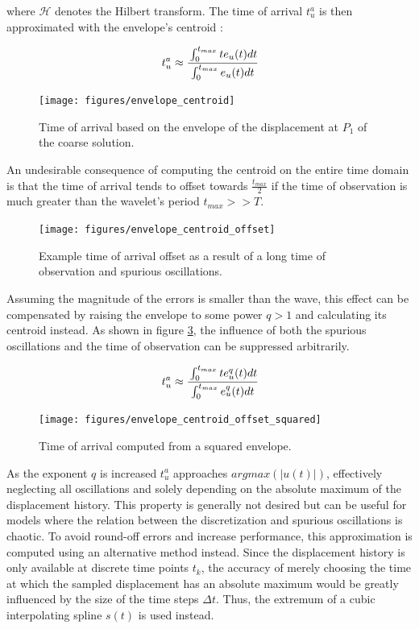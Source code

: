 where $\mathcal{H}$ denotes the Hilbert transform. The time of arrival $t^a_u$ is then approximated with the envelope's centroid \cite{Duczek2014_2}:

\begin{equation} \label{eq:time_of_arrival_envelope_centroid}
	t^a_u \approx \cfrac{ \int_0^{t_{max}} t e_u(t) dt }{ \int_0^{t_{max}} e_u(t) dt }
\end{equation}

\begin{figure}[h]
	\centering
	\texttt{[image: figures/envelope\_centroid]}
	\caption{Time of arrival based on the envelope of the displacement at $P_1$ of the coarse solution.}
	\label{fig:envelope_centroid}
\end{figure}

An undesirable consequence of computing the centroid on the entire time domain is that the time of arrival tends to offset towards $\frac{t_{max}}{2}$ if the time of observation is much greater than the wavelet's period $t_{max} >> T$.

\begin{figure}[h]
	\centering
	\texttt{[image: figures/envelope\_centroid\_offset]}
	\caption{Example time of arrival offset as a result of a long time of observation and spurious oscillations.}
	\label{fig:envelope_centroid_offset}
\end{figure}

Assuming the magnitude of the errors is smaller than the wave, this effect can be compensated by raising the envelope to some power $q>1$ and calculating its centroid instead. As shown in figure \ref{fig:envelope_centroid_offset_squared}, the influence of both the spurious oscillations and the time of observation can be suppressed arbitrarily.

\begin{equation} \label{eq:time_of_arrival_envelope_centroid_modified}
t^a_u \approx \cfrac{ \int_0^{t_{max}} t e_u^q(t) dt }{ \int_0^{t_{max}} e_u^q(t) dt }
\end{equation}

\begin{figure}[h]
	\centering
	\texttt{[image: figures/envelope\_centroid\_offset\_squared]}
	\caption{Time of arrival computed from a squared envelope.}
	\label{fig:envelope_centroid_offset_squared}
\end{figure}

As the exponent $q$ is increased $t^a_u$ approaches $argmax(|u(t)|)$, effectively neglecting all oscillations and solely depending on the absolute maximum of the displacement history. This property is generally not desired but can be useful for models where the relation between the discretization and spurious oscillations is chaotic. To avoid round-off errors and increase performance, this approximation is computed using an alternative method instead. Since the displacement history is only available at discrete time points $t_k$, the accuracy of merely choosing the time at which the sampled displacement has an absolute maximum would be greatly influenced by the size of the time steps $\Delta t$. Thus, the extremum of a cubic interpolating spline $s(t)$ is used instead.

